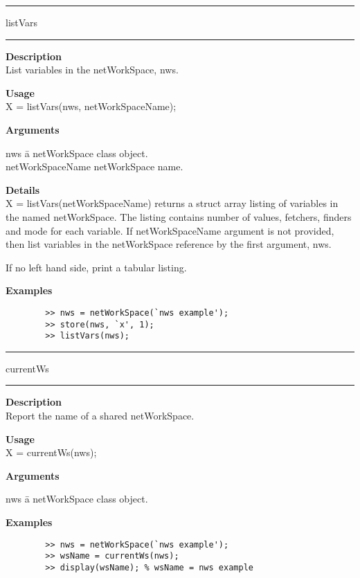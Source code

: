 \rule[0.06in]{6in}{0.01in}
\newline
listVars
\newline
\rule{6in}{0.01in}
\begin{list}{}{}
	\item {\bf Description}\\
	List variables in the netWorkSpace, nws.
	\item {\bf Usage}\\
	X = listVars(nws, netWorkSpaceName);
	\item {\bf Arguments}
		\begin{tabbing}
		nws \hspace{3.0cm} \= a netWorkSpace class object.\\
		netWorkSpaceName \> netWorkSpace name.
		\end{tabbing}
	\item {\bf Details}\\
	X = listVars(netWorkSpaceName) returns a struct array listing
	of variables in the named netWorkSpace. The listing contains number of values,
	fetchers, finders and mode for each variable. If netWorkSpaceName argument
        is not provided, then list variables in the netWorkSpace reference by the first argument, nws. 
     
	If no left hand side, print a tabular listing.
	\item {\bf Examples}
		\begin{verbatim}
		>> nws = netWorkSpace(`nws example');
		>> store(nws, `x', 1);
		>> listVars(nws);
		\end{verbatim}
\end{list}

\rule[0.06in]{6in}{0.01in}
\newline
currentWs
\newline
\rule{6in}{0.01in}
\begin{list}{}{}
	\item {\bf Description}\\
	Report the name of a shared netWorkSpace.
	\item {\bf Usage}\\
	X = currentWs(nws);
	\item {\bf Arguments}
		\begin{tabbing}
		nws	\hspace{2.5cm} \= a netWorkSpace class object.
		\end{tabbing}
	\item {\bf Examples}
		\begin{verbatim}
		>> nws = netWorkSpace(`nws example');
		>> wsName = currentWs(nws);
		>> display(wsName); % wsName = nws example 
		\end{verbatim}
\end{list}

